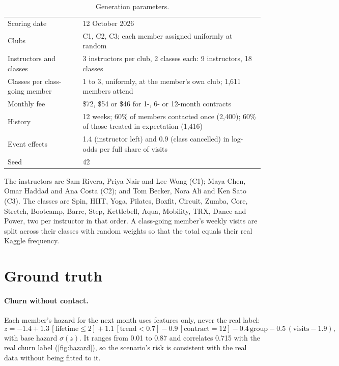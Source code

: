 \begin{table}[tb]
  \caption{Generation parameters.}
  \label{tab:scenparams}
  \begin{tabularx}{\linewidth}{@{}l L@{}}
    \toprule
     &  \\
    \midrule
    Scoring date & 12 October 2026 \\
    Clubs & C1, C2, C3; each member assigned uniformly at random \\
    Instructors and classes & 3 instructors per club, 2 classes each: 9 instructors, 18 classes \\
    Classes per class-going member & 1 to 3, uniformly, at the member's own club; 1,611 members attend \\
    Monthly fee & \$72, \$54 or \$46 for 1-, 6- or 12-month contracts \\
    History & 12 weeks; 60\% of members contacted once (2,400); 60\% of those treated in expectation (1,416) \\
    Event effects & 1.4 (instructor left) and 0.9 (class cancelled) in log-odds per full share of visits \\
    Seed & 42 \\
    \bottomrule
  \end{tabularx}
\end{table}

The instructors are Sam Rivera, Priya Nair and Lee Wong (C1); Maya Chen, Omar Haddad and Ana Costa (C2); and Tom Becker, Nora Ali and Ken Sato (C3). The classes are Spin, HIIT, Yoga, Pilates, Boxfit, Circuit, Zumba, Core, Stretch, Bootcamp, Barre, Step, Kettlebell, Aqua, Mobility, TRX, Dance and Power, two per instructor in that order. A class-going member's weekly visits are split across their classes with random weights so that the total equals their real Kaggle frequency.

\section{Ground truth}

\paragraph{Churn without contact.} Each member's hazard for the next month uses features only, never the real label:
\begin{equation}
  z = -1.4 + 1.3\,[\text{lifetime} \le 2] + 1.1\,[\text{trend} < 0.7] - 0.9\,[\text{contract} = 12] - 0.4\,\text{group} - 0.5\,(\text{visits} - 1.9),
\end{equation}
with base hazard $\sigma(z)$. It ranges from 0.01 to 0.87 and correlates 0.715 with the real churn label (\cref{fig:hazard}), so the scenario's risk is consistent with the real data without being fitted to it.

